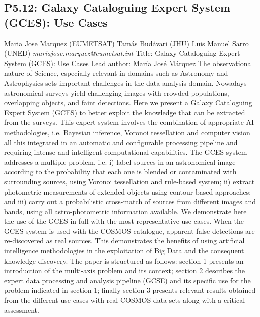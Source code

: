 \documentclass{report}
\begin{document}
\subsection*{P5.12: Galaxy Cataloguing Expert System (GCES): Use Cases}
\bigskip
Maria Jose Marquez (EUMETSAT) \newline Tamás Budávari (JHU) \newline  Luis Manuel Sarro (UNED)\newline   \newline  \newline  \newline\newline
{\it mariajose.marquez@eumetsat.int}\newline
\newline\newline
Title: Galaxy Cataloguing Expert System (GCES): Use Cases
Lead author: María José Márquez
The observational nature of Science, especially relevant in domains such as Astronomy and Astrophysics sets important challenges in the data analysis domain. Nowadays astronomical surveys yield challenging images with crowded populations, overlapping objects, and faint detections. Here we present a Galaxy Cataloguing Expert System (GCES) to better exploit the knowledge that can be extracted from the surveys. This expert system involves the combination of appropriate AI methodologies, i.e. Bayesian inference, Voronoi tessellation and computer vision all this integrated in an automatic and configurable processing pipeline and requiring intense and intelligent computational capabilities. The GCES system addresses a multiple problem, i.e. i) label sources in an astronomical image according to the probability that each one is blended or contaminated with surrounding sources, using Voronoi tessellation and rule-based system; ii) extract photometric measurements of extended objects using contour-based approaches; and iii) carry out a probabilistic cross-match of sources from different images and bands, using all astro-photometric information available. We demonstrate here the use of the GCES in full with the most representative use cases. When the GCES system is used with the COSMOS catalogue, apparent false detections are re-discovered as real sources. This demonstrates the benefits of using artificial intelligence methodologies in the exploitation of Big Data and the consequent knowledge discovery. The paper is structured as follows: section 1 presents an introduction of the multi-axis problem and its context; section 2 describes the expert data processing and analysis pipeline (GCSE) and its specific use for the problem indicated in section 1; finally section 3 presents relevant results obtained from the different use cases with real COSMOS data sets along with a critical assessment.\newline
\newpage
\end{document}
